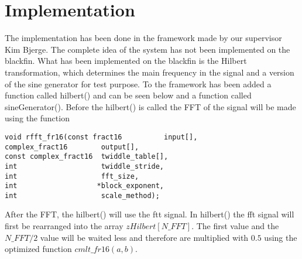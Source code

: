 
\section{Implementation}
\label{sec:impl}
The implementation has been done in the framework made by our supervisor Kim Bjerge. The complete idea of the system has not been implemented on the blackfin. What has been implemented on the blackfin is the Hilbert transformation, which determines the main frequency in the signal and a version of the sine generator for test purpose. 
To the framework has been added a function called hilbert() and can be seen below and a function called sineGenerator(). Before the hilbert() is called the FFT of the signal will be made using the function 
\begin{verbatim}
void rfft_fr16(const fract16          input[],
complex_fract16        output[],
const complex_fract16  twiddle_table[],
int                    twiddle_stride,
int                    fft_size,
int                   *block_exponent,
int                    scale_method);
\end{verbatim}
After the FFT, the hilbert() will use the ftt signal. In hilbert() the fft signal will first be rearranged into the array $zHilbert[N\_FFT]$. The first value and the $N\_FFT/2$ value will be waited less and therefore are multiplied with $0.5$ using the optimized function $cmlt\_fr16(a,b)$. 

